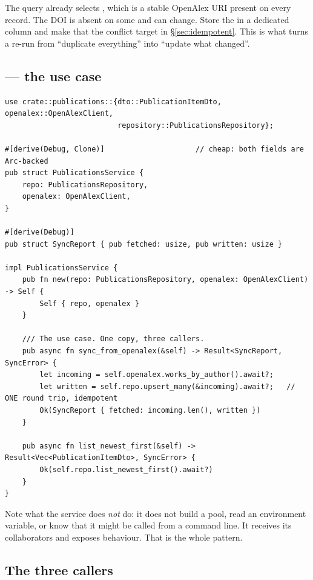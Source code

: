 \begin{pattern}
The query already selects , which is a stable OpenAlex URI present on every record. The DOI
is absent on some and can change. Store the  in a dedicated
 column and make that the conflict target in
\S\ref{sec:idempotent}. This is what turns a re-run from ``duplicate everything'' into ``update
what changed''.
\end{pattern}

\subsection{ --- the use case}

\begin{lstlisting}[style=rs,caption={\file{src/publications/service.rs}}]
use crate::publications::{dto::PublicationItemDto, openalex::OpenAlexClient,
                          repository::PublicationsRepository};

#[derive(Debug, Clone)]                     // cheap: both fields are Arc-backed
pub struct PublicationsService {
    repo: PublicationsRepository,
    openalex: OpenAlexClient,
}

#[derive(Debug)]
pub struct SyncReport { pub fetched: usize, pub written: usize }

impl PublicationsService {
    pub fn new(repo: PublicationsRepository, openalex: OpenAlexClient) -> Self {
        Self { repo, openalex }
    }

    /// The use case. One copy, three callers.
    pub async fn sync_from_openalex(&self) -> Result<SyncReport, SyncError> {
        let incoming = self.openalex.works_by_author().await?;
        let written = self.repo.upsert_many(&incoming).await?;   // ONE round trip, idempotent
        Ok(SyncReport { fetched: incoming.len(), written })
    }

    pub async fn list_newest_first(&self) -> Result<Vec<PublicationItemDto>, SyncError> {
        Ok(self.repo.list_newest_first().await?)
    }
}
\end{lstlisting}

Note what the service does \emph{not} do: it does not build a pool, read an environment variable, or
know that it might be called from a command line. It receives its collaborators and exposes
behaviour. That is the whole pattern.

\subsection{The three callers}


